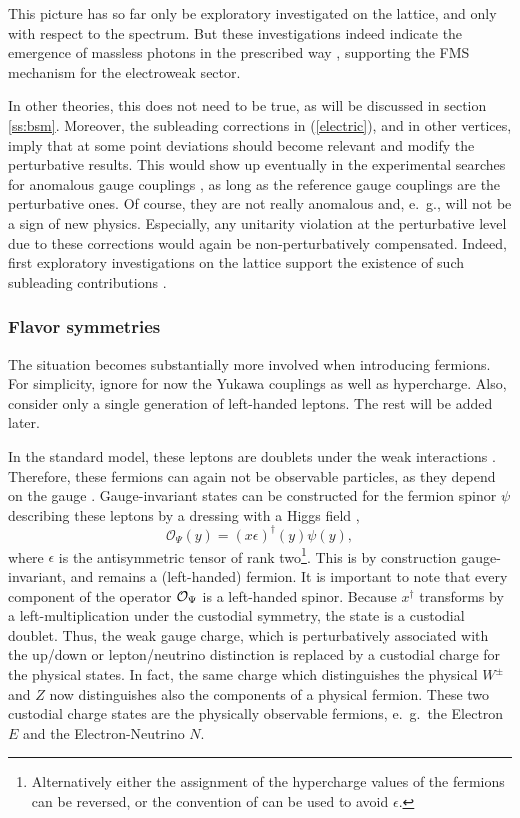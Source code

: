 \documentclass[final,twoside,12pt]{article}
\newcommand*{\no}{\noindent}
\newcommand*{\be}{\begin{equation}}
\newcommand*{\ee}{\end{equation}}
\newcommand*{\pref}[1]{(\ref{#1})}
\newcommand*{\1}{1\!\!\!\bot}
\newcommand*{\op}{{\cal O}}
\begin{document}
This picture has so far only be exploratory investigated on the lattice, and only with respect to the spectrum. But these investigations indeed indicate the emergence of massless photons in the prescribed way \cite{Shrock:1985ur,Shrock:1985un,Lee:1985yi}, supporting the FMS mechanism for the electroweak sector.

In other theories, this does not need to be true, as will be discussed in section \ref{ss:bsm}. Moreover, the subleading corrections in \pref{electric}, and in other vertices, imply that at some point deviations should become relevant and modify the perturbative results. This would show up eventually in the experimental searches for anomalous gauge couplings \cite{Gounaris:1996rz,Baak:2013fwa}, as long as the reference gauge couplings are the perturbative ones. Of course, they are not really anomalous and, e.\ g., will not be a sign of new physics. Especially, any unitarity violation at the perturbative level due to these corrections \cite{Bohm:2001yx} would again be non-perturbatively compensated. Indeed, first exploratory investigations on the lattice support the existence of such subleading contributions \cite{Raubitzek:unpublished}.

\subsubsection{Flavor symmetries}\label{ss:flavor}

The situation becomes substantially more involved when introducing fermions. For simplicity, ignore for now the Yukawa couplings as well as hypercharge. Also, consider only a single generation of left-handed leptons. The rest will be added later.

In the standard model, these leptons are doublets under the weak interactions \cite{Bohm:2001yx}. Therefore, these fermions can again not be observable particles, as they depend on the gauge \cite{Frohlich:1980gj,Frohlich:1981yi}. Gauge-invariant states can be constructed for the fermion spinor $\psi$ describing these leptons by a dressing with a Higgs field \cite{Frohlich:1980gj,Frohlich:1981yi,Egger:2017tkd},
\be
\mathcal{O}_\Psi(y)= (x\epsilon)^{\dagger}(y)\psi(y)\label{opferm},
\ee
\no where $\epsilon$ is the antisymmetric tensor of rank two\footnote{Alternatively either the assignment of the hypercharge values of the fermions can be reversed, or the convention of \cite{Egger:2017tkd} can be used to avoid $\epsilon$.}. This is by construction gauge-invariant, and remains a (left-handed) fermion. It is important to note that every component of the operator $\op_\Psi$ is a left-handed spinor. Because $x^\dagger$ transforms by a left-multiplication under the custodial symmetry, the state is a custodial doublet. Thus, the weak gauge charge, which is perturbatively associated with the up/down or lepton/neutrino distinction \cite{Bohm:2001yx} is replaced by a custodial charge for the physical states. In fact, the same charge which distinguishes the physical $W^\pm$ and $Z$ now distinguishes also the components of a physical fermion. These two custodial charge states are the physically observable fermions, e.\ g.\ the Electron $E$ and the Electron-Neutrino $N$.
\end{document}
